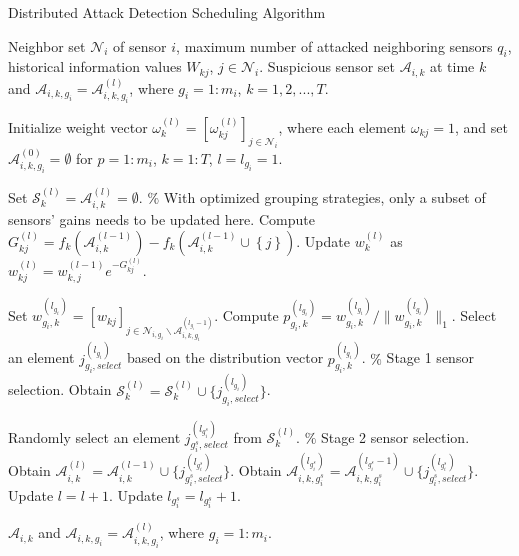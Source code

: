 \begin{algorithm}[t]  
\renewcommand{\thealgorithm}{3.3}
	\caption{Distributed Attack Detection Scheduling Algorithm}
	\label{alg:3-1}  
 
	\begin{algorithmic}[1]  
		\Require  
		Neighbor set $\mathcal{N}_i$ of sensor $i$, maximum number of attacked neighboring sensors $q_i$, historical information values $W_{kj}$, $j\in\mathcal {N}_i$.  
		\Ensure  
		Suspicious sensor set $\mathcal{A}_{i,k}$ at time $k$ and $\mathcal{A}_{i,k,g_i}=\mathcal{A}_{i,k,g_i}^{(l)}$, where $g_i=1:m_i$, $k=1,2,...,T$.
		
		\State Initialize weight vector $\omega_{k}^{(l)}=[\omega_{kj}^{(l)}]_{j\in\mathcal{N}_{i}}$, 
  where each element $\omega _{kj}=1$, and set $\mathcal{A}_{i,k,g_i}^{(0)}=\emptyset$ for $p=1:m_i$, $k=1:T$, $l=l_{g_i}=1$.

		\State Set $\mathcal{S}_{k}^{(l)}=\mathcal{A}_{i,k}^{(l)}=\emptyset$.
        \Statex \quad\quad\quad $\%$ With optimized grouping strategies, only a subset of sensors' gains needs to be updated here.
		\State Compute $G_{kj}^{(l)} = f_k( \mathcal{A}_{i,k}^{(l-1)} )-f_k( \mathcal{A}_{i,k}^{(l-1)}\cup \left\{ j \right\} ) $.
    \State Update $w_{k}^{(l)}$ as $w_{kj}^{(l)}= w_{k,j}^{(l-1)}e^{ -G_{kj}^{(l)}}$.
  \EndFor
		
		\State Set $w_{g_i,k}^{(l_{g_i})}=\left[ w_{kj} \right] _{j\in \mathcal{N} _{i,g_i}\backslash \mathcal{A} _{i,k,g_i}^{(l_{g_i}-1)}}$.
		\State Compute $p_{g_i,k}^{(l_{g_i})}=w_{g_i,k}^{(l_{g_i})}/\| w_{g_i,k}^{(l_{g_i})}\|_1$.
		\State Select an element $j^{(l_{g_i})}_{g_i,select}$ based on the distribution vector $p_{g_i,k}^{(l_{g_i})}$. $\%$ Stage 1 sensor selection.
		\State Obtain $\mathcal{S}_{k}^{(l)}=\mathcal{S}_{k}^{(l)}\cup \{j^{(l_{g_i})}_{g_i,select}\}$.

		\EndFor

		\State Randomly select an element $j_{g_i^s,select}^{(l_{g_i^s})}$ from $\mathcal{S}_{k}^{(l)}$. $\%$ Stage 2 sensor selection.
		\State Obtain $\mathcal{A}_{i,k}^{(l)}=\mathcal{A}_{i,k}^{(l-1)}\cup \{j_{g_i^s,select}^{(l_{g_i^s})}\}$.
		\State Obtain $\mathcal{A}_{i,k,g_i^s}^{(l_{g_i^s})}=\mathcal{A}_{i,k,g_i^s}^{(l_{g_i^s}-1)}\cup \{j^{(l_{g_i^s})}_{{g_i^s},select}\}$.
		\State Update $l=l+1$.
		\State Update $l_{g_i^s}=l_{g_i^s}+1$.
		\EndWhile

		\State \Return $\mathcal{A}_{i,k}$ and $\mathcal{A}_{i,k,g_i}=\mathcal{A}_{i,k,g_i}^{(l)}$, where $g_i=1:m_i$.
	\end{algorithmic}  
\end{algorithm}

